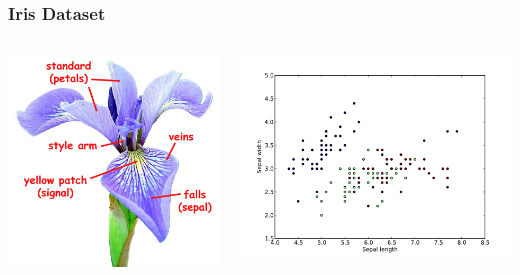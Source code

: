\documentclass[10pt, colorlinks]{beamer}
\begin{document}
\begin{frame}[fragile]\frametitle{Iris Dataset}
\begin{columns}[c]
    \centering
    \includegraphics[width=\textwidth]{figs/iris}

\includegraphics[width=\textwidth]{plwfigis/CursP_4_figure8}

\end{columns}
\end{frame}
\end{document}
